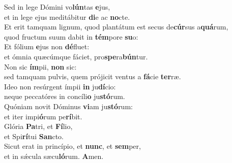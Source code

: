 \evenverse Sed in lege Dómini vo\textbf{lún}tas \textbf{e}jus,~\*\\
\evenverse et in lege ejus meditábitur \textbf{di}e ac \textbf{no}cte.\\
\oddverse Et erit tamquam lignum, quod plantátum est secus de\textbf{cúr}sus a\textbf{quá}rum,~\*\\
\oddverse quod fructum suum dabit in \textbf{tém}pore \textbf{su}o:\\
\evenverse Et fólium \textbf{e}jus non \textbf{dé}fluet:~\*\\
\evenverse et ómnia quæcúmque fáciet, pro\textbf{spe}ra\textbf{bún}tur.\\
\oddverse Non sic \textbf{ím}pii, \textbf{non} sic:~\*\\
\oddverse sed tamquam pulvis, quem prójicit ventus a \textbf{fá}cie \textbf{ter}ræ.\\
\evenverse Ideo non resúrgent ímpii \textbf{in} ju\textbf{dí}cio:~\*\\
\evenverse neque peccatóres in concíli\textbf{o} ju\textbf{stó}rum.\\
\oddverse Quóniam novit Dóminus \textbf{vi}am ju\textbf{stó}rum:~\*\\
\oddverse et iter impi\textbf{ó}rum pe\textbf{rí}bit.\\
\evenverse Glória \textbf{Pa}tri, et \textbf{Fí}lio,~\*\\
\evenverse et Spi\textbf{rí}tui \textbf{San}cto.\\
\oddverse Sicut erat in princípio, et \textbf{nunc}, et \textbf{sem}per,~\*\\
\oddverse et in sǽcula sæcu\textbf{ló}rum. \textbf{A}men.\\
